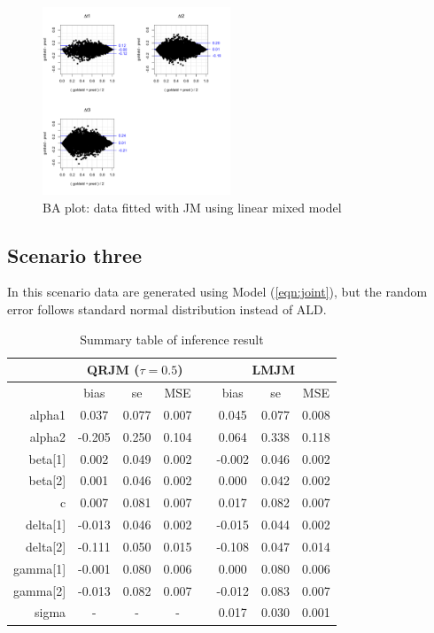 \documentclass{article}
\begin{document}
\begin{figure}[H]
\centering
\includegraphics[width=0.5\textwidth]{ba_qt50data_meanfit.pdf}
\caption{BA plot: data fitted with JM using linear mixed model}
\end{figure}




\subsection{Scenario three}
In this scenario data are generated using Model (\ref{eqn:joint}), but the random error follows standard normal distribution instead of ALD.



\begin{table}[H]
\centering
\caption{Summary table of inference result}
\begin{tabular}{rccccccc}
\hline
& \multicolumn{3}{c}{QRJM ($\tau=0.5$)} & & \multicolumn{3}{c}{LMJM}\\
\hline
 & bias & se & MSE & & bias & se & MSE \\
 \cline{2-4}  \cline{6-8}
alpha1 & 0.037 & 0.077 & 0.007 & & 0.045 & 0.077 & 0.008 \\
  alpha2 & -0.205 & 0.250 & 0.104  & & 0.064 & 0.338 & 0.118 \\
  beta[1] & 0.002 & 0.049 & 0.002 & & -0.002 & 0.046 & 0.002 \\
  beta[2] & 0.001 & 0.046 & 0.002 & & 0.000 & 0.042 & 0.002 \\
  c & 0.007 & 0.081 & 0.007& &  0.017 & 0.082 & 0.007 \\
  delta[1] & -0.013 & 0.046 & 0.002 & & -0.015 & 0.044 & 0.002 \\
  delta[2] & -0.111 & 0.050 & 0.015 & & -0.108 & 0.047 & 0.014 \\
  gamma[1] & -0.001 & 0.080 & 0.006 & & 0.000 & 0.080 & 0.006 \\
  gamma[2] & -0.013 & 0.082 & 0.007 & &  -0.012 & 0.083 & 0.007 \\
  sigma & - & - & - & & 0.017 & 0.030 & 0.001 \\
   \hline
\end{tabular}
\end{table}
\end{document}
